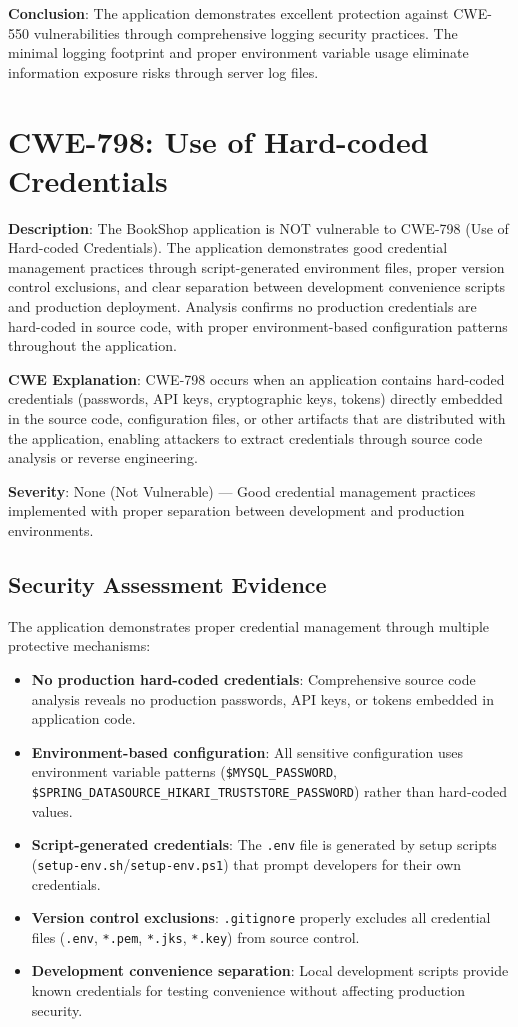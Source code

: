 \documentclass[]{UCD_CS_FYP_Report}
\begin{document}
\textbf{Conclusion}: The application demonstrates excellent protection against CWE-550 vulnerabilities through comprehensive logging security practices. The minimal logging footprint and proper environment variable usage eliminate information exposure risks through server log files.


\section{CWE-798: Use of Hard-coded Credentials}

\textbf{Description}: The BookShop application is NOT vulnerable to CWE-798 (Use of Hard-coded Credentials). The application demonstrates good credential management practices through script-generated environment files, proper version control exclusions, and clear separation between development convenience scripts and production deployment. Analysis confirms no production credentials are hard-coded in source code, with proper environment-based configuration patterns throughout the application.

\textbf{CWE Explanation}: CWE-798 occurs when an application contains hard-coded credentials (passwords, API keys, cryptographic keys, tokens) directly embedded in the source code, configuration files, or other artifacts that are distributed with the application, enabling attackers to extract credentials through source code analysis or reverse engineering.

\textbf{Severity}: None (Not Vulnerable) — Good credential management practices implemented with proper separation between development and production environments.

\subsection{Security Assessment Evidence}
The application demonstrates proper credential management through multiple protective mechanisms:
\begin{itemize}
	\item \textbf{No production hard-coded credentials}: Comprehensive source code analysis reveals no production passwords, API keys, or tokens embedded in application code.
	\item \textbf{Environment-based configuration}: All sensitive configuration uses environment variable patterns (\texttt{\${MYSQL\_PASSWORD}}, \texttt{\${SPRING\_DATASOURCE\_HIKARI\_TRUSTSTORE\_PASSWORD}}) rather than hard-coded values.
	\item \textbf{Script-generated credentials}: The \texttt{.env} file is generated by setup scripts (\texttt{setup-env.sh}/\texttt{setup-env.ps1}) that prompt developers for their own credentials.
	\item \textbf{Version control exclusions}: \texttt{.gitignore} properly excludes all credential files (\texttt{.env}, \texttt{*.pem}, \texttt{*.jks}, \texttt{*.key}) from source control.
	\item \textbf{Development convenience separation}: Local development scripts provide known credentials for testing convenience without affecting production security.
\end{itemize}
\end{document}
